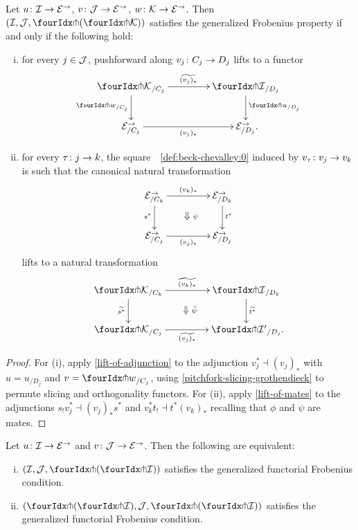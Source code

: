 \documentclass[reqno,10pt,a4paper,oneside,draft]{amsart}
\begin{document}
{{\begin{proposition} \label{lift-pushforward}
Let $u \co \cal{I} \to \catE^\to$, $v \co \cal{J} \to \cal{E}^\to$, $w \co \cal{K} \to \catE^\to$.
Then $(\cal{I}, \cal{J}, \liftl{(\liftr{\cal{K}})})$ satisfies the generalized Frobenius property if and only if the following hold:
\begin{enumerate}[(i)]
\item for every $j \in \cal{J}$, pushforward along $v_j \co C_j \to D_j$ lifts to a functor
\[
\xymatrix@C=1.5cm{
  {\liftr{\cal{K}}}_{/C_j}
  \ar[r]^{\widetilde{(v_j)_*}}
  \ar[d]_{\liftr{w}_{/C_j}}
&
  {\liftr{\cal{I}}}_{/D_j}
  \ar[d]^{{\liftr{u}}_{/D_j}}
\\
  \catE_{/C_j}^\to
  \ar[r]_{(v_j)_*}
&
  \catE_{/D_j}^\to
\rlap{.}}
\]
\item for every $\tau \co j \to k$, the square~~\eqref{def:beck-chevalley:0} induced by $v_\tau \co v_j \to v_k$ is such that the canonical natural transformation
\[
\xymatrix@C+2em{
  \catE^\to_{/C_k}
  \ar[r]^{(v_k)_*}
  \ar[d]_{s^*}
  \ar@{}[dr]|{\textstyle\Downarrow \rlap{$\labelstyle\psi$}}
&
  \catE^\to_{/D_k}
  \ar[d]^{t^*}
\\
  \catE^\to_{/C_j}
  \ar[r]_{(v_j)_*}
&
  \catE^\to_{/D_j}
}
\]
lifts to a natural transformation
\[
\xymatrix@C+2em{
  {\liftr{\cal{K}}}_{/C_k}
  \ar[r]^{\widetilde{(v_k)_*}}
  \ar[d]_{\widetilde{s^*}}
  \ar@{}[dr]|{\textstyle\Downarrow \rlap{$\labelstyle\tilde{\psi}$}}
&
  {\liftr{\cal{I}}}_{/D_k}
  \ar[d]^{\widetilde{t^*}}
\\
  {\liftr{\cal{K}}}_{/C_j}
  \ar[r]_{\widetilde{(v_j)_*}}
&
  {\liftr{\cal{I}'}}_{/D_j}
\rlap{.}}
\]
\end{enumerate}
\end{proposition}

\begin{proof}
For (i), apply \cref{lift-of-adjunction} to the adjunction $v_j^* \dashv (v_j)_*$ with $u = u_{/D_j}$ and $v = {\liftr{w}}_{/C_j}$, using \cref{pitchfork-slicing-grothendieck} to permute slicing and orthogonality functors.
For (ii), apply \cref{lift-of-mates} to the adjunctions $s_! v_j^* \dashv (v_j)_* s^*$ and $v_k^* t_! \dashv t^* (v_k)_*$ recalling that $\phi$ and $\psi$ are mates.
\end{proof}

\begin{proposition} \label{double-pitchfork-in-generalized-uniform-frob}
Let $u \co \cal{I} \to \catE^\to$ and $v \co \cal{J} \to \catE^\to$.
Then the following are equivalent:
\begin{enumerate}[(i)]
\item $(\cal{I}, \cal{J}, \liftl{(\liftr{\cal{I}})})$ satisfies the generalized functorial Frobenius condition.
\item $(\liftl{(\liftr{\cal{I}})}, \cal{J}, \liftl{(\liftr{\cal{I}})})$ satisfies the generalized functorial Frobenius condition.
\end{enumerate}
\end{proposition}

}}
\end{document}
